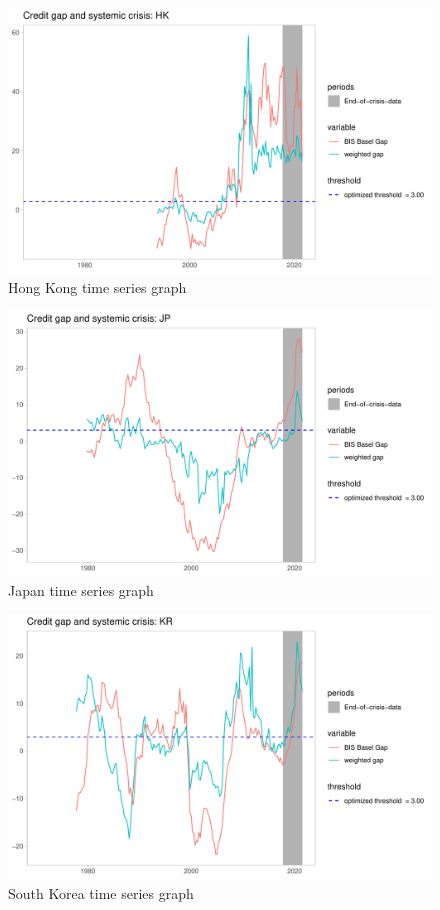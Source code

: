 \documentclass[
  12pt,
]{article}
\begin{document}
\begin{figure}[H]

{\centering \includegraphics[width=0.85\linewidth]{../Data/Output/Graphs/All/Weighted_credit_gap_HK} 

}

\caption{Hong Kong time series graph}\label{fig:HKseries}
\end{figure}

\begin{figure}[H]

{\centering \includegraphics[width=0.85\linewidth]{../Data/Output/Graphs/All/Weighted_credit_gap_JP} 

}

\caption{Japan time series graph}\label{fig:JPseries}
\end{figure}

\begin{figure}[H]

{\centering \includegraphics[width=0.85\linewidth]{../Data/Output/Graphs/All/Weighted_credit_gap_KR} 

}

\caption{South Korea time series graph}\label{fig:KRseries}
\end{figure}
\end{document}
